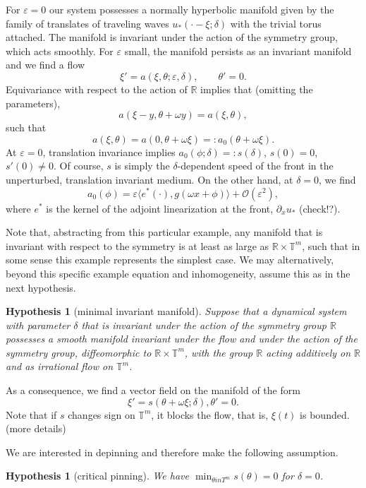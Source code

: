 \documentclass[letterpaper,11pt]{article}
\newcommand{\R}{\mathbb{R}}
\newcommand{\T}{\mathbb{T}}
\newcommand{\rmO}{\mathcal{O}}
\numberwithin{equation}{section}
\theoremstyle{plain}
\newtheorem{Hypothesis}[theorem]{Hypothesis}
\begin{document}
For $\varepsilon=0$ our system possesses a normally hyperbolic manifold given by the family of translates of traveling waves $u_*(\cdot-\xi;\delta)$ with the trivial torus attached. The manifold is invariant under the action of the symmetry group, which acts smoothly. For $\varepsilon$ small, the manifold persists as an invariant manifold and we find a flow  \cite{ssw}
\[
\xi'=a(\xi,\theta;\varepsilon,\delta),\qquad \theta'=0.
\]
Equivariance with respect to the action of $\R$ implies that (omitting the parameters),
\[
a(\xi-y,\theta+\omega y)=a(\xi,\theta),
\]
such that 
\[
a(\xi,\theta)=a(0,\theta+\omega \xi)=:a_0(\theta+\omega\xi).
\]
At $\varepsilon=0$, translation invariance implies $a_0(\phi;\delta)=:s(\delta)$, $s(0)=0$, $s'(0)\neq 0$. Of course, $s$ is simply the $\delta$-dependent speed of the front in the unperturbed, translation invariant medium. On the other hand, at $\delta=0$, we find 
\[
a_0(\phi)=\varepsilon \langle e^*(\cdot),g(\omega x+\phi)\rangle +\rmO(\varepsilon^2),
\]
where $e^*$ is the kernel of the adjoint linearization at the front, $\partial_xu_*$ (check!?). 

Note that, abstracting from this particular example, any manifold that is invariant with respect to the symmetry is at least as large as $\R\times \T^m$, such that in some sense this example represents the simplest case. We may alternatively, beyond this specific example equation and inhomogeneity, assume this as in the next hypothesis.

\begin{Hypothesis}[minimal invariant manifold]
Suppose that a dynamical system with parameter $\delta$ that is invariant under the action of the symmetry group $\R$ possesses a smooth manifold invariant under the flow and under the action of the symmetry group, diffeomorphic to $\R\times \T^m$,  with the group $\R$ acting additively on $\R$ and as irrational flow on $\T^m$. 
\end{Hypothesis}
As a consequence, we find a vector field on the manifold of the form 
\[
\xi'=s(\theta+\omega\xi;\delta), \theta'=0.
\]
Note that if $s$ changes sign on $\T^m$, it blocks the flow, that is, $\xi(t)$ is bounded.(more details)

We are interested in depinning and therefore make the following assumption.

\begin{Hypothesis}[critical pinning]
We have $\min_{\theta in T^m} s(\theta)=0$ for $\delta=0$.
\end{Hypothesis}
\end{document}
